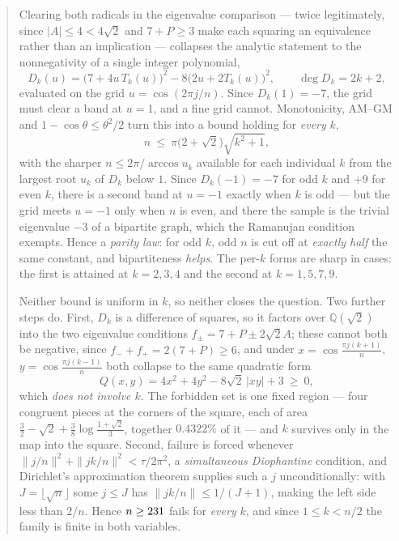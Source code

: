 \documentclass[11pt]{article}
\theoremstyle{definition}
\begin{document}
\begin{abstract}
Clearing both radicals in the eigenvalue comparison --- twice legitimately,
since $|A|\le4<4\sqrt2$ and $7+P\ge3$ make each squaring an equivalence rather
than an implication --- collapses the analytic statement to the nonnegativity of
a single integer polynomial,
\[
  D_k(u)=\bigl(7+4u\,T_k(u)\bigr)^2-8\bigl(2u+2T_k(u)\bigr)^2,
  \qquad\deg D_k=2k+2,
\]
evaluated on the grid $u=\cos(2\pi j/n)$. Since $D_k(1)=-7$, the grid must clear
a band at $u=1$, and a fine grid cannot. Monotonicity, AM--GM and
$1-\cos\theta\le\theta^2/2$ turn this into a bound holding for \emph{every} $k$,
\[
  n\ \le\ \pi\bigl(2+\sqrt2\bigr)\sqrt{k^2+1},
\]
with the sharper $n\le2\pi/\arccos u_k$ available for each individual $k$ from
the largest root $u_k$ of $D_k$ below $1$.
Since $D_k(-1)=-7$ for odd $k$ and $+9$ for even $k$, there is a second band at
$u=-1$ exactly when $k$ is odd --- but the grid meets $u=-1$ only when $n$ is
even, and there the sample is the trivial eigenvalue $-3$ of a bipartite graph,
which the Ramanujan condition exempts. Hence a \emph{parity law}: for odd $k$,
odd $n$ is cut off at \emph{exactly half} the same constant, and bipartiteness
\emph{helps}. The per-$k$ forms are sharp in cases: the first is attained at
$k=2,3,4$ and the second at $k=1,5,7,9$.

Neither bound is uniform in $k$, so neither closes the question. Two further
steps do. First, $D_k$ is a difference of squares, so it factors over
$\mathbb Q(\sqrt2)$ into the two eigenvalue conditions $f_\pm=7+P\pm2\sqrt2A$;
these cannot both be negative, since $f_-+f_+=2(7+P)\ge6$, and under
$x=\cos\frac{\pi j(k+1)}{n}$, $y=\cos\frac{\pi j(k-1)}{n}$ both collapse to the
same quadratic form
\[
  Q(x,y)=4x^{2}+4y^{2}-8\sqrt2\,|xy|+3\ \ge\ 0 ,
\]
which \emph{does not involve $k$}. The forbidden set is one fixed region --- four
congruent pieces at the corners of the square, each of area
$\tfrac32-\sqrt2+\tfrac38\log\frac{1+\sqrt2}{3}$, together $0.4322\%$ of it ---
and $k$ survives only in the map into the square. Second, failure is forced
whenever $\|j/n\|^{2}+\|jk/n\|^{2}<\tau/2\pi^{2}$, a \emph{simultaneous
Diophantine} condition, and Dirichlet's approximation theorem supplies such a
$j$ unconditionally: with $J=\lfloor\sqrt n\rfloor$ some $j\le J$ has
$\|jk/n\|\le1/(J+1)$, making the left side less than $2/n$. Hence
$n\ge\RamDirichlet$ fails for \emph{every} $k$, and since $1\le k<n/2$ the family
is finite in both variables.


\end{abstract}
\end{document}
